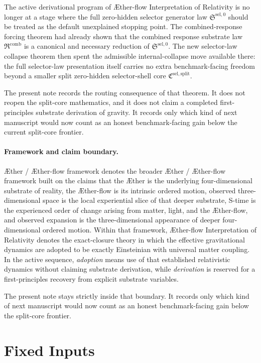 \documentclass[11pt]{article}
\newcommand{\Aether}{\AE{}ther}
\newcommand{\Aflow}{\AE{}ther-flow}
\newcommand{\TheoryName}{\Aflow{} Interpretation of Relativity}
\newcommand{\TheoryProgram}{\Aether{} / \Aflow{} framework}
\newcommand{\CombinedLaw}{\mathfrak R^{\mathrm{comb}}}
\newcommand{\SelectorLaw}{\mathfrak S^{\mathrm{sel},0}}
\newcommand{\SelectorCore}{\mathfrak C^{\mathrm{sel,split}}}
\begin{document}
The active derivational program of \TheoryName{} is no longer at a stage where the full zero-hidden selector generator law \(\SelectorLaw\) should be treated as the default unexplained stopping point. The combined-response forcing theorem had already shown that the combined response substrate law \(\CombinedLaw\) is a canonical and necessary reduction of \(\SelectorLaw\). The new selector-law collapse theorem then spent the admissible internal-collapse move available there: the full selector-law presentation itself carries no extra benchmark-facing freedom beyond a smaller split zero-hidden selector-shell core \(\SelectorCore\).

The present note records the routing consequence of that theorem. It does not reopen the split-core mathematics, and it does not claim a completed first-principles substrate derivation of gravity. It records only which kind of next manuscript would now count as an honest benchmark-facing gain below the current split-core frontier.

\paragraph{Framework and claim boundary.}
\TheoryProgram{} denotes the broader \Aether{} / \Aflow{} framework built on the claims that the \Aether{} is the underlying four-dimensional substrate of reality, the \Aflow{} is its intrinsic ordered motion, observed three-dimensional space is the local experiential slice of that deeper substrate, S-time is the experienced order of change arising from matter, light, and the \Aflow{}, and observed expansion is the three-dimensional appearance of deeper four-dimensional ordered motion. Within that framework, \TheoryName{} denotes the exact-closure theory in which the effective gravitational dynamics are adopted to be exactly Einsteinian with universal matter coupling. In the active sequence, \emph{adoption} means use of that established relativistic dynamics without claiming substrate derivation, while \emph{derivation} is reserved for a first-principles recovery from explicit substrate variables.

The present note stays strictly inside that boundary. It records only which kind of next manuscript would now count as an honest benchmark-facing gain below the split-core frontier.

\section{Fixed Inputs}
\end{document}

